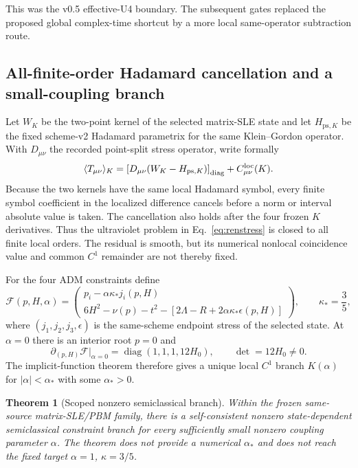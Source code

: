 \documentclass[11pt]{article}
\newtheorem{theorem}{Theorem}[section]
\theoremstyle{definition}
\theoremstyle{remark}
\begin{document}
This was the v0.5 effective-U4 boundary. The subsequent gates replaced the proposed global complex-time shortcut by a more local same-operator subtraction route.

\subsection{All-finite-order Hadamard cancellation and a small-coupling branch}

Let $W_K$ be the two-point kernel of the selected matrix-SLE state and let $H_{\mathrm{ps},K}$ be the fixed scheme-v2 Hadamard parametrix for the same Klein--Gordon operator. With $D_{\mu\nu}$ the recorded point-split stress operator, write formally
\begin{equation}\label{eq:renstress}
 \langle T_{\mu\nu}\rangle_K
 =\left[D_{\mu\nu}(W_K-H_{\mathrm{ps},K})\right]_{\rm diag}
 +C^{\rm loc}_{\mu\nu}(K).
\end{equation}
Because the two kernels have the same local Hadamard symbol, every finite symbol coefficient in the localized difference cancels before a norm or interval absolute value is taken. The cancellation also holds after the four frozen $K$ derivatives. Thus the ultraviolet problem in Eq.~\eqref{eq:renstress} is closed to all finite local orders. The residual is smooth, but its numerical nonlocal coincidence value and common $C^1$ remainder are not thereby fixed.

For the four ADM constraints define
\begin{equation}\label{eq:constraintmap}
 \mathcal F(p,H,\alpha)=
 \begin{pmatrix}
 p_i-\alpha\kappa_*j_i(p,H)\\
 6H^2-\nu(p)-t^2-\left[2\Lambda-R+2\alpha\kappa_*\epsilon(p,H)\right]
 \end{pmatrix},
 \qquad \kappa_*=\frac35,
\end{equation}
where $(j_1,j_2,j_3,\epsilon)$ is the same-scheme endpoint stress of the selected state. At $\alpha=0$ there is an interior root $p=0$ and
\begin{equation}
 \partial_{(p,H)}\mathcal F\big|_{\alpha=0}
 =\operatorname{diag}(1,1,1,12H_0),
 \qquad \det=12H_0\ne0.
\end{equation}
The implicit-function theorem therefore gives a unique local $C^1$ branch $K(\alpha)$ for $|\alpha|<\alpha_*$ with some $\alpha_*>0$.

\begin{theorem}[Scoped nonzero semiclassical branch]\label{thm:smallcoupling}
Within the frozen same-source matrix-SLE/PBM family, there is a self-consistent nonzero state-dependent semiclassical constraint branch for every sufficiently small nonzero coupling parameter $\alpha$. The theorem does not provide a numerical $\alpha_*$ and does not reach the fixed target $\alpha=1$, $\kappa=3/5$.
\end{theorem}
\end{document}
